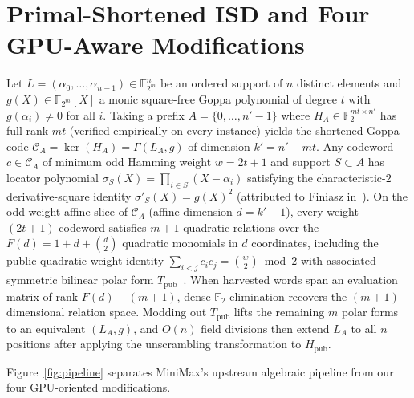 \documentclass[11pt,a4paper]{article}
\begin{document}
\section{Primal-Shortened ISD and Four GPU-Aware Modifications}

Let $L = (\alpha_0, \dots, \alpha_{n-1}) \in \mathbb{F}_{2^m}^n$ be an ordered support of $n$ distinct elements and $g(X) \in \mathbb{F}_{2^m}[X]$ a monic square-free Goppa polynomial of degree $t$ with $g(\alpha_i) \ne 0$ for all $i$. Taking a prefix $A = \{0, \dots, n'-1\}$ where $H_A \in \mathbb{F}_2^{mt \times n'}$ has full rank $mt$ (verified empirically on every instance) yields the shortened Goppa code $\mathcal{C}_A = \ker(H_A) = \Gamma(L_A, g)$ of dimension $k' = n' - mt$. Any codeword $c \in \mathcal{C}_A$ of minimum odd Hamming weight $w = 2t + 1$ and support $S \subset A$ has locator polynomial $\sigma_S(X) = \prod_{i \in S}(X - \alpha_i)$ satisfying the characteristic-$2$ derivative-square identity $\sigma'_S(X) = g(X)^2$ (attributed to Finiasz in~\cite{MiniMax26}). On the odd-weight affine slice of $\mathcal{C}_A$ (affine dimension $d = k' - 1$), every weight-$(2t+1)$ codeword satisfies $m+1$ quadratic relations over the $F(d) = 1 + d + \binom{d}{2}$ quadratic monomials in $d$ coordinates, including the public quadratic weight identity $\sum_{i<j} c_i c_j = \binom{w}{2} \bmod 2$ with associated symmetric bilinear polar form $T_{\mathrm{pub}}$~\cite{MiniMax26}. When harvested words span an evaluation matrix of rank $F(d) - (m+1)$, dense $\mathbb{F}_2$ elimination recovers the $(m+1)$-dimensional relation space. Modding out $T_{\mathrm{pub}}$ lifts the remaining $m$ polar forms to an equivalent $(L_A, g)$, and $O(n)$ field divisions then extend $L_A$ to all $n$ positions after applying the unscrambling transformation to $H_{\mathrm{pub}}$.

Figure~\ref{fig:pipeline} separates MiniMax's upstream algebraic pipeline from our four GPU-oriented modifications.
\end{document}
